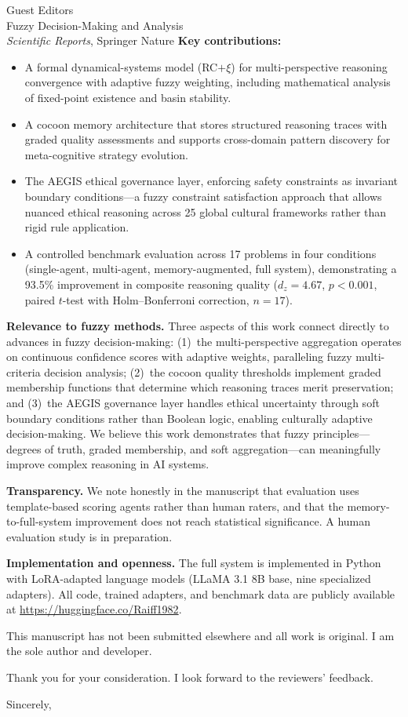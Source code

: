 \documentclass[11pt]{letter}
\begin{document}
\begin{letter}{Guest Editors\\
Fuzzy Decision-Making and Analysis\\
\emph{Scientific Reports}, Springer Nature}
\textbf{Key contributions:}
\begin{itemize}
    \item A formal dynamical-systems model (RC$+\xi$) for multi-perspective reasoning convergence with adaptive fuzzy weighting, including mathematical analysis of fixed-point existence and basin stability.
    \item A cocoon memory architecture that stores structured reasoning traces with graded quality assessments and supports cross-domain pattern discovery for meta-cognitive strategy evolution.
    \item The AEGIS ethical governance layer, enforcing safety constraints as invariant boundary conditions---a fuzzy constraint satisfaction approach that allows nuanced ethical reasoning across 25 global cultural frameworks rather than rigid rule application.
    \item A controlled benchmark evaluation across 17 problems in four conditions (single-agent, multi-agent, memory-augmented, full system), demonstrating a 93.5\% improvement in composite reasoning quality ($d_z = 4.67$, $p < 0.001$, paired $t$-test with Holm--Bonferroni correction, $n = 17$).
\end{itemize}

\textbf{Relevance to fuzzy methods.} Three aspects of this work connect directly to advances in fuzzy decision-making: (1)~the multi-perspective aggregation operates on continuous confidence scores with adaptive weights, paralleling fuzzy multi-criteria decision analysis; (2)~the cocoon quality thresholds implement graded membership functions that determine which reasoning traces merit preservation; and (3)~the AEGIS governance layer handles ethical uncertainty through soft boundary conditions rather than Boolean logic, enabling culturally adaptive decision-making. We believe this work demonstrates that fuzzy principles---degrees of truth, graded membership, and soft aggregation---can meaningfully improve complex reasoning in AI systems.

\textbf{Transparency.} We note honestly in the manuscript that evaluation uses template-based scoring agents rather than human raters, and that the memory-to-full-system improvement does not reach statistical significance. A human evaluation study is in preparation.

\textbf{Implementation and openness.} The full system is implemented in Python with LoRA-adapted language models (LLaMA 3.1 8B base, nine specialized adapters). All code, trained adapters, and benchmark data are publicly available at \url{https://huggingface.co/Raiff1982}.

This manuscript has not been submitted elsewhere and all work is original. I am the sole author and developer.

Thank you for your consideration. I look forward to the reviewers' feedback.

\closing{Sincerely,}

\end{letter}
\end{document}
